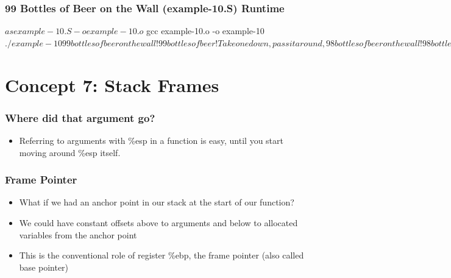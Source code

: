 \documentclass[11pt,xcolor=dvipsnames]{beamer}
\newcommand{\mvs}{\vspace{-0.95em}}
\begin{document}
\begin{frame}[fragile,t]
\mvs
\frametitle{99 Bottles of Beer on the Wall (example-10.S) Runtime}
\begin{textcode}
$ as example-10.S -o example-10.o
$ gcc example-10.o -o example-10
$ ./example-10
99 bottles of beer on the wall! 99 bottles of beer!
Take one down, pass it around, 98 bottles of beer on the wall!
98 bottles of beer on the wall! 98 bottles of beer!
Take one down, pass it around, 97 bottles of beer on the wall!
97 bottles of beer on the wall! 97 bottles of beer!
...
3 bottles of beer on the wall! 3 bottles of beer!
Take one down, pass it around, 2 bottles of beer on the wall!
2 bottles of beer on the wall! 2 bottles of beer!
Take one down, pass it around, 1 bottles of beer on the wall!
1 bottles of beer on the wall! 1 bottles of beer!
Take one down, pass it around, 0 bottles of beer on the wall!
No more bottles of beer on the wall!
$
\end{textcode}
\end{frame}

\section{Concept 7: Stack Frames}

\begin{frame}[fragile,t]
\frametitle{Where did that argument go?}
\mvs
\begin{itemize}
  \item Referring to arguments with {\ttfamily \%esp} in a function is easy, until you start moving around {\ttfamily \%esp} itself.
\end{itemize}
\end{frame}

\begin{frame}[fragile,t]
\frametitle{Frame Pointer}
\begin{itemize}
  \item What if we had an anchor point in our stack at the start of our function?
  \item We could have constant offsets above to arguments and below to allocated variables from the anchor point
  \pause
  \item This is the conventional role of register {\ttfamily \%ebp}, the frame pointer (also called base pointer)
\end{itemize}
\end{frame}
\end{document}
